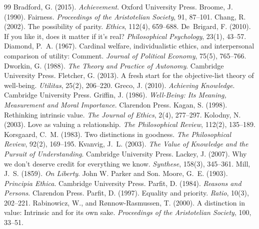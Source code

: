 \documentclass{situationist-preprint}
\begin{document}
\begin{thebibliography}{99}\small
{} Bradford, G. (2015). \emph{Achievement}. Oxford University Press.
 Broome, J. (1990). Fairness. \emph{Proceedings of the Aristotelian Society}, 91, 87--101.
 Chang, R. (2002). The possibility of parity. \emph{Ethics}, 112(4), 659--688.
 De~Brigard, F. (2010). If you like it, does it matter if it's real? \emph{Philosophical Psychology}, 23(1), 43--57.
 Diamond, P.~A. (1967). Cardinal welfare, individualistic ethics, and interpersonal comparison of utility: Comment. \emph{Journal of Political Economy}, 75(5), 765--766.
 Dworkin, G. (1988). \emph{The Theory and Practice of Autonomy}. Cambridge University Press.
 Fletcher, G. (2013). A fresh start for the objective-list theory of well-being. \emph{Utilitas}, 25(2), 206--220.
 Greco, J. (2010). \emph{Achieving Knowledge}. Cambridge University Press.
 Griffin, J. (1986). \emph{Well-Being: Its Meaning, Measurement and Moral Importance}. Clarendon Press.
 Kagan, S. (1998). Rethinking intrinsic value. \emph{The Journal of Ethics}, 2(4), 277--297.
 Kolodny, N. (2003). Love as valuing a relationship. \emph{The Philosophical Review}, 112(2), 135--189.
 Korsgaard, C.~M. (1983). Two distinctions in goodness. \emph{The Philosophical Review}, 92(2), 169--195.
 Kvanvig, J.~L. (2003). \emph{The Value of Knowledge and the Pursuit of Understanding}. Cambridge University Press.
 Lackey, J. (2007). Why we don't deserve credit for everything we know. \emph{Synthese}, 158(3), 345--361.
 Mill, J.~S. (1859). \emph{On Liberty}. John W. Parker and Son.
 Moore, G.~E. (1903). \emph{Principia Ethica}. Cambridge University Press.
 Parfit, D. (1984). \emph{Reasons and Persons}. Clarendon Press.
 Parfit, D. (1997). Equality and priority. \emph{Ratio}, 10(3), 202--221.
 Rabinowicz, W., and R{\o}nnow-Rasmussen, T. (2000). A distinction in value: Intrinsic and for its own sake. \emph{Proceedings of the Aristotelian Society}, 100, 33--51.

\end{thebibliography}
\end{document}
